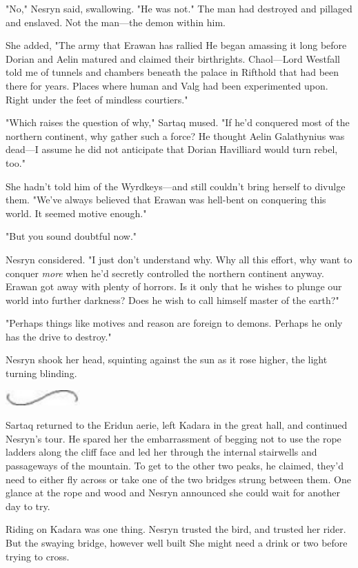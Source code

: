 "No," Nesryn said, swallowing. "He was not." The man had destroyed and pillaged and enslaved. Not the man---the demon within him.

She added, "The army that Erawan has rallied  He began amassing it long before Dorian and Aelin matured and claimed their birthrights. Chaol---Lord Westfall told me of tunnels and chambers beneath the palace in Rifthold that had been there for years. Places where human and Valg had been experimented upon. Right under the feet of mindless courtiers."

"Which raises the question of why," Sartaq mused. "If he'd conquered most of the northern continent, why gather such a force? He thought Aelin Galathynius was dead---I assume he did not anticipate that Dorian Havilliard would turn rebel, too."

She hadn't told him of the Wyrdkeys---and still couldn't bring herself to divulge them. "We've always believed that Erawan was hell-bent on conquering this world. It seemed motive enough."

"But you sound doubtful now."

Nesryn considered. "I just don't understand why. Why all this effort, why want to conquer \emph{more} when he'd secretly controlled the northern continent anyway. Erawan got away with plenty of horrors. Is it only that he wishes to plunge our world into further darkness? Does he wish to call himself master of the earth?"

"Perhaps things like motives and reason are foreign to demons. Perhaps he only has the drive to destroy."

Nesryn shook her head, squinting against the sun as it rose higher, the light turning blinding.

\includegraphics[width=1.12in,height=0.24in]{images/seperator}

Sartaq returned to the Eridun aerie, left Kadara in the great hall, and continued Nesryn's tour. He spared her the embarrassment of begging not to use the rope ladders along the cliff face and led her through the internal stairwells and passageways of the mountain. To get to the other two peaks, he claimed, they'd need to either fly across or take one of the two bridges strung between them. One glance at the rope and wood and Nesryn announced she could wait for another day to try.

Riding on Kadara was one thing. Nesryn trusted the bird, and trusted her rider. But the swaying bridge, however well built  She might need a drink or two before trying to cross.

